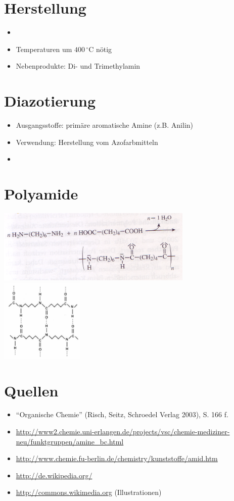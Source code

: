 \documentclass[11pt]{article}
\begin{document}
\clearpage

\section{Herstellung}
\begin{itemize}
  \item {}
  \item Temperaturen um $400\,^{\circ}\mathrm{C}$ nötig
  \item Nebenprodukte: Di- und Trimethylamin
\end{itemize}

\section{Diazotierung}
\begin{itemize}
\item Ausgangsstoffe: primäre aromatische Amine (z.B. Anilin)
\item Verwendung: Herstellung vom Azofarbmitteln
\item {}
\end{itemize}

\section{Polyamide}
\includegraphics[width=0.7\textwidth]{polyamid-reaktion.png}
\includegraphics[width=0.3\textwidth]{polyamid.png}

\section{Quellen}
\begin{itemize}
\item ``Organische Chemie'' (Risch, Seitz, Schroedel Verlag 2003),  S. 166 f.
\item \url{http://www2.chemie.uni-erlangen.de/projects/vsc/chemie-mediziner-neu/funktgruppen/amine_bc.html}
\item \url{http://www.chemie.fu-berlin.de/chemistry/kunststoffe/amid.htm}
\item \url{http://de.wikipedia.org/}
\item \url{http://commons.wikimedia.org} (Illustrationen)
\end{itemize}
\end{document}

